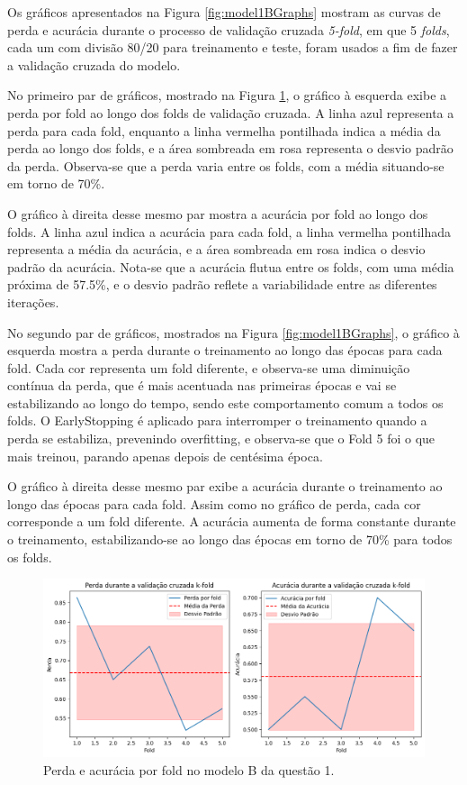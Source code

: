 \documentclass[12pt]{article}
\begin{document}
Os gráficos apresentados na Figura \ref{fig:model1BGraphs} mostram as curvas de perda e acurácia durante o processo de validação cruzada \textit{5-fold}, em que 5 \textit{folds}, cada um com divisão 80/20 para treinamento e teste, foram usados a fim de fazer a validação cruzada do modelo.

No primeiro par de gráficos, mostrado na Figura \ref{fig:model1Bfold}, o gráfico à esquerda exibe a perda por fold ao longo dos folds de validação cruzada. A linha azul representa a perda para cada fold, enquanto a linha vermelha pontilhada indica a média da perda ao longo dos folds, e a área sombreada em rosa representa o desvio padrão da perda. Observa-se que a perda varia entre os folds, com a média situando-se em torno de 70\%.

O gráfico à direita desse mesmo par mostra a acurácia por fold ao longo dos folds. A linha azul indica a acurácia para cada fold, a linha vermelha pontilhada representa a média da acurácia, e a área sombreada em rosa indica o desvio padrão da acurácia. Nota-se que a acurácia flutua entre os folds, com uma média próxima de 57.5\%, e o desvio padrão reflete a variabilidade entre as diferentes iterações.

No segundo par de gráficos, mostrados na Figura \ref{fig:model1BGraphs}, o gráfico à esquerda mostra a perda durante o treinamento ao longo das épocas para cada fold. Cada cor representa um fold diferente, e observa-se uma diminuição contínua da perda, que é mais acentuada nas primeiras épocas e vai se estabilizando ao longo do tempo, sendo este comportamento comum a todos os folds. O EarlyStopping é aplicado para interromper o treinamento quando a perda se estabiliza, prevenindo overfitting, e observa-se que o Fold 5 foi o que mais treinou, parando apenas depois de centésima época.

O gráfico à direita desse mesmo par exibe a acurácia durante o treinamento ao longo das épocas para cada fold. Assim como no gráfico de perda, cada cor corresponde a um fold diferente. A acurácia aumenta de forma constante durante o treinamento, estabilizando-se ao longo das épocas em torno de 70\% para todos os folds.

\begin{figure}[H]
    \centering
    \includegraphics[width=1\linewidth]{casoB1folds.png}
    \caption{Perda e acurácia por fold no modelo B da questão 1.}
    \label{fig:model1Bfold}
\end{figure}
\end{document}
